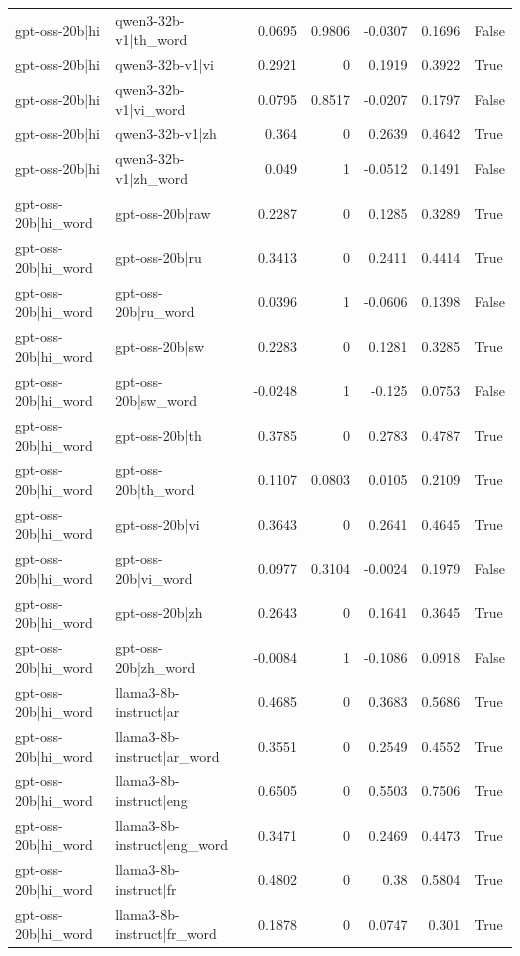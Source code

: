 \begin{table}
\begin{tabular}{l l r r r r l}
gpt-oss-20b|hi & qwen3-32b-v1|th_word & 0.0695 & 0.9806 & -0.0307 & 0.1696 & False \\
gpt-oss-20b|hi & qwen3-32b-v1|vi & 0.2921 & 0 & 0.1919 & 0.3922 & True \\
gpt-oss-20b|hi & qwen3-32b-v1|vi_word & 0.0795 & 0.8517 & -0.0207 & 0.1797 & False \\
gpt-oss-20b|hi & qwen3-32b-v1|zh & 0.364 & 0 & 0.2639 & 0.4642 & True \\
gpt-oss-20b|hi & qwen3-32b-v1|zh_word & 0.049 & 1 & -0.0512 & 0.1491 & False \\
gpt-oss-20b|hi_word & gpt-oss-20b|raw & 0.2287 & 0 & 0.1285 & 0.3289 & True \\
gpt-oss-20b|hi_word & gpt-oss-20b|ru & 0.3413 & 0 & 0.2411 & 0.4414 & True \\
gpt-oss-20b|hi_word & gpt-oss-20b|ru_word & 0.0396 & 1 & -0.0606 & 0.1398 & False \\
gpt-oss-20b|hi_word & gpt-oss-20b|sw & 0.2283 & 0 & 0.1281 & 0.3285 & True \\
gpt-oss-20b|hi_word & gpt-oss-20b|sw_word & -0.0248 & 1 & -0.125 & 0.0753 & False \\
gpt-oss-20b|hi_word & gpt-oss-20b|th & 0.3785 & 0 & 0.2783 & 0.4787 & True \\
gpt-oss-20b|hi_word & gpt-oss-20b|th_word & 0.1107 & 0.0803 & 0.0105 & 0.2109 & True \\
gpt-oss-20b|hi_word & gpt-oss-20b|vi & 0.3643 & 0 & 0.2641 & 0.4645 & True \\
gpt-oss-20b|hi_word & gpt-oss-20b|vi_word & 0.0977 & 0.3104 & -0.0024 & 0.1979 & False \\
gpt-oss-20b|hi_word & gpt-oss-20b|zh & 0.2643 & 0 & 0.1641 & 0.3645 & True \\
gpt-oss-20b|hi_word & gpt-oss-20b|zh_word & -0.0084 & 1 & -0.1086 & 0.0918 & False \\
gpt-oss-20b|hi_word & llama3-8b-instruct|ar & 0.4685 & 0 & 0.3683 & 0.5686 & True \\
gpt-oss-20b|hi_word & llama3-8b-instruct|ar_word & 0.3551 & 0 & 0.2549 & 0.4552 & True \\
gpt-oss-20b|hi_word & llama3-8b-instruct|eng & 0.6505 & 0 & 0.5503 & 0.7506 & True \\
gpt-oss-20b|hi_word & llama3-8b-instruct|eng_word & 0.3471 & 0 & 0.2469 & 0.4473 & True \\
gpt-oss-20b|hi_word & llama3-8b-instruct|fr & 0.4802 & 0 & 0.38 & 0.5804 & True \\
gpt-oss-20b|hi_word & llama3-8b-instruct|fr_word & 0.1878 & 0 & 0.0747 & 0.301 & True \\

\end{tabular}
\end{table}
